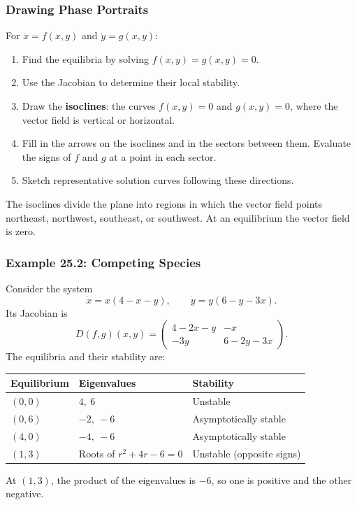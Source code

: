 \documentclass[9pt,aspectratio=169]{beamer}
\begin{document}
\begin{frame}
    \frametitle{Drawing Phase Portraits}
    For $\dot x=f(x,y)$ and $\dot y=g(x,y)$:
    \begin{enumerate}
        \item Find the equilibria by solving $f(x,y)=g(x,y)=0$.
        \item Use the Jacobian to determine their local stability.
        \item Draw the \textbf{isoclines}: the curves $f(x,y)=0$ and
        $g(x,y)=0$, where the vector field is vertical or horizontal.
        \item Fill in the arrows on the isoclines and in the sectors
        between them. Evaluate the signs of $f$ and $g$ at a point in
        each sector.
        \item Sketch representative solution curves following these
        directions.
    \end{enumerate}
    \medskip
    The isoclines divide the plane into regions in which the vector field
    points northeast, northwest, southeast, or southwest. At an
    equilibrium the vector field is zero.
\end{frame}

\begin{frame}
    \frametitle{Example 25.2: Competing Species}
    Consider the system
    \[
        \dot x=x(4-x-y),\qquad \dot y=y(6-y-3x).
    \]
    Its Jacobian is
    \[
        D(f,g)(x,y)=
        \begin{pmatrix}
            4-2x-y & -x\\
            -3y & 6-2y-3x
        \end{pmatrix}.
    \]
    The equilibria and their stability are:
    \begin{center}
        \begin{tabular}{lll}
            \toprule
            Equilibrium & Eigenvalues & Stability\\
            \midrule
            $(0,0)$ & $4,\ 6$ & Unstable\\
            $(0,6)$ & $-2,\ -6$ & Asymptotically stable\\
            $(4,0)$ & $-4,\ -6$ & Asymptotically stable\\
            $(1,3)$ & Roots of $r^2+4r-6=0$ & Unstable (opposite signs)\\
            \bottomrule
        \end{tabular}
    \end{center}
    At $(1,3)$, the product of the eigenvalues is $-6$, so one is positive
    and the other negative.
\end{frame}
\end{document}
